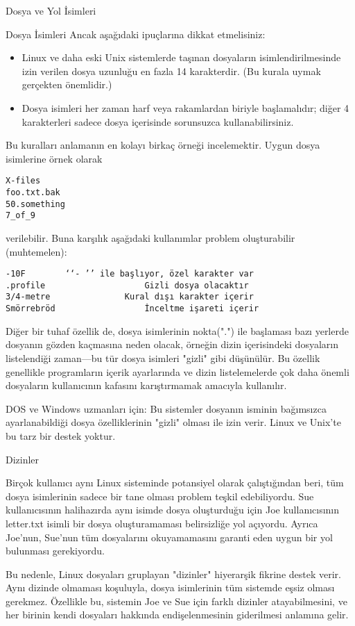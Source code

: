 \documentclass[10pt,a5paper]{book}
\begin{document}
\begin{section}{Dosya ve Yol İsimleri}
\begin{subsection}{Dosya İsimleri}
Ancak aşağıdaki ipuçlarına dikkat etmelisiniz:
\begin{itemize}
\item Linux ve daha eski Unix sistemlerde taşınan dosyaların isimlendirilmesinde izin verilen dosya uzunluğu en fazla 14 karakterdir. (Bu kurala uymak gerçekten önemlidir.)
\item Dosya isimleri her zaman harf veya rakamlardan biriyle başlamalıdır; diğer 4 karakterleri sadece dosya içerisinde sorunsuzca kullanabilirsiniz.
\end{itemize}

Bu kuralları anlamanın en kolayı birkaç örneği incelemektir. Uygun dosya isimlerine örnek olarak
\begin{verbatim}
X-files
foo.txt.bak
50.something
7_of_9
\end{verbatim}
verilebilir. Buna karşılık aşağıdaki kullanımlar problem oluşturabilir (muhtemelen):
\begin{verbatim}
-10F 		‘‘- ’’ ile başlıyor, özel karakter var
.profile 					Gizli dosya olacaktır
3/4-metre 				Kural dışı karakter içerir
Smörrebröd 					İnceltme işareti içerir
\end{verbatim}

Diğer bir tuhaf özellik de, dosya isimlerinin nokta(".") ile başlaması bazı yerlerde dosyanın gözden kaçmasına neden olacak, örneğin dizin içerisindeki dosyaların listelendiği zaman—bu tür dosya isimleri "gizli" gibi düşünülür. Bu özellik genellikle programların içerik ayarlarında ve dizin listelemelerde çok daha önemli dosyaların kullanıcının kafasını karıştırmamak amacıyla kullanılır.

DOS ve Windows uzmanları için: Bu sistemler dosyanın isminin bağımsızca ayarlanabildiği dosya özelliklerinin "gizli" olması ile izin verir. Linux ve Unix'te bu tarz bir destek yoktur.
\end{subsection}
\begin{subsection}{Dizinler}

Birçok kullanıcı aynı Linux sisteminde potansiyel olarak çalıştığından beri, tüm dosya isimlerinin sadece bir tane olması problem teşkil edebiliyordu. Sue kullanıcısının halihazırda aynı isimde dosya oluşturduğu için Joe kullanıcısının letter.txt isimli bir dosya oluşturamaması belirsizliğe yol açıyordu. Ayrıca Joe'nun, Sue'nun tüm dosyalarını okuyamamasını garanti eden uygun bir yol bulunması gerekiyordu.

	Bu nedenle, Linux dosyaları gruplayan "dizinler" hiyerarşik fikrine destek verir. Aynı dizinde olmaması koşuluyla, dosya isimlerinin  tüm sistemde eşsiz olması gerekmez. Özellikle bu, sistemin Joe ve Sue için farklı dizinler atayabilmesini, ve her birinin kendi dosyaları hakkında endişelenmesinin giderilmesi anlamına gelir.
	

\end{subsection}
\end{section}
\end{document}
